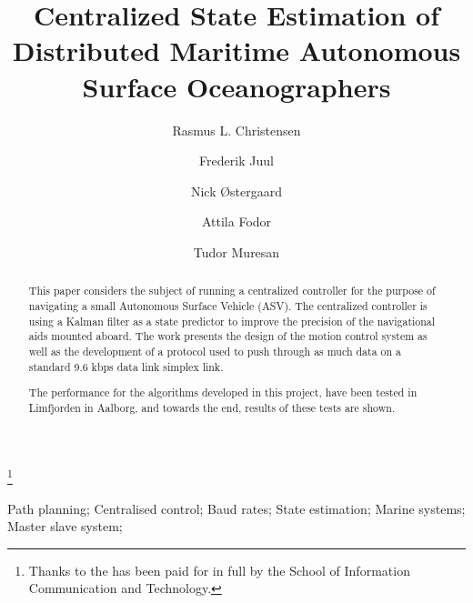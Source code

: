 \documentclass{ifacconf}
\begin{document}
\begin{frontmatter}

\title{Centralized State Estimation of Distributed Maritime Autonomous Surface Oceanographers} %

\thanks[footnoteinfo]{Thanks to the  has been paid for in full by the School of Information Communication and Technology.}

\author[First]{Rasmus L. Christensen} 
\author[First]{Frederik Juul} 
\author[First]{Nick \O stergaard}
\author[First]{Attila Fodor}
\author[First]{Tudor Muresan}
\address[First]{Department of Electronic Systems, Aalborg University, Fredrik Bajers Vej 7, 9220 Aalborg \O st, Denmark (e-mail: \{ralch,nickoe,fjuul,tmures12,afodor12\}@es.aau.dk)}                                            
          
\begin{keyword}                           %
Path planning; Centralised control; Baud rates; State estimation; Marine systems; Master slave system;              %
\end{keyword}                             %


\begin{abstract}                          %
This paper considers the subject of running a centralized controller for the purpose of navigating a small Autonomous Surface Vehicle (ASV). The centralized controller is using a Kalman filter as a state predictor to improve the precision of the navigational aids mounted aboard. The work presents the design of the motion control system as well as the development of a protocol used to push through as much data on a standard 9.6 kbps data link simplex link.

The performance for the algorithms developed in this project, have been tested in Limfjorden in Aalborg, and towards the end, results of these tests are shown. 
\end{abstract}

\end{frontmatter}
\end{document}

